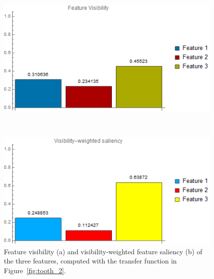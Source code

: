 \begin{figure}
	\centering
	\begin{minipage}{.45\textwidth}
		\includegraphics[width=1\linewidth]{images/tooth_balance_visibility_chart}
		\subcaption{}
	\end{minipage}~
	\begin{minipage}{.45\textwidth}
		\includegraphics[width=1\linewidth]{images/tooth_balance_visibility_saliency_weighted_chart}
		\subcaption{}
	\end{minipage}
	\caption{Feature visibility (a) and visibility-weighted feature saliency (b) of the three features, computed with the transfer function in Figure~\ref{fig:tooth_2}.}
	\label{fig:tooth_saliency_chart_2}
\end{figure}

